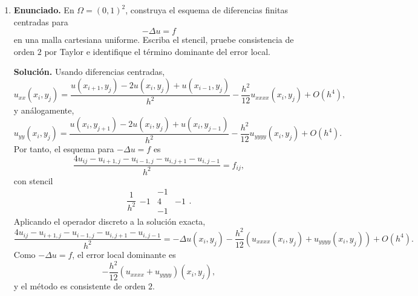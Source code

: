 \documentclass[11pt]{article}
\newcommand{\norm}[1]{\left\lVert #1\right\rVert}
\def\mat   #1{\mbox{\boldmath $\mathsf #1$}}
\def\vec   #1{\mbox{\boldmath $#1$}{}}
\begin{document}
\begin{enumerate}[label=\textbf{\arabic*.}, leftmargin=*]
    Sea $\vec u_h$ la solución discreta y sea $\vec u^I$ la restricción de la solución exacta a la malla. Si $\mat A_h$ denota la matriz del operador discreto, entonces
    \[
        \mat A_h\vec u_h=\vec f_h,
        \qquad
        \mat A_h\vec u^I=\vec f_h+\vec\tau_h,
    \]
    donde $\vec\tau_h$ es el error de truncamiento local. Para el error $\vec e_h=\vec u_h-\vec u^I$,
    \[
        \mat A_h\vec e_h=-\vec\tau_h.
    \]
    Si se dispone de estabilidad uniforme,
    \[
        \norm{\vec v_h}\le C\norm{\mat A_h\vec v_h}
        \qquad\text{con }C\text{ independiente de }h,
    \]
    entonces
    \[
        \norm{\vec e_h}
        \le
        C\norm{\vec\tau_h}
        =
        O(h^2).
    \]
    Así se obtiene convergencia global de orden $2$ en la norma considerada.

    En cambio, si sólo se tiene
    \[
        \norm{\vec v_h}\le C_h\norm{\mat A_h\vec v_h},
        \qquad C_h\to\infty,
    \]
    entonces
    \[
        \norm{\vec e_h}\le C_h\norm{\vec\tau_h}=O(C_hh^2).
    \]
    Esta cota implica convergencia únicamente si $C_hh^2\to0$. Además, aunque haya convergencia, el orden global puede ser menor que el orden local. Este es el punto central: consistencia local más estabilidad implica convergencia; consistencia sola no controla la propagación del error.

    \item \textbf{Enunciado.} En $\Omega=(0,1)^2$, construya el esquema de diferencias finitas centradas para
    \[
        -\Delta u=f
    \]
    en una malla cartesiana uniforme. Escriba el stencil, pruebe consistencia de orden $2$ por Taylor e identifique el término dominante del error local.

    \textbf{Solución.} Usando diferencias centradas,
    \[
        u_{xx}(x_i,y_j)
        =
        \frac{u(x_{i+1},y_j)-2u(x_i,y_j)+u(x_{i-1},y_j)}{h^2}
        -\frac{h^2}{12}u_{xxxx}(x_i,y_j)+O(h^4),
    \]
    y análogamente,
    \[
        u_{yy}(x_i,y_j)
        =
        \frac{u(x_i,y_{j+1})-2u(x_i,y_j)+u(x_i,y_{j-1})}{h^2}
        -\frac{h^2}{12}u_{yyyy}(x_i,y_j)+O(h^4).
    \]
    Por tanto, el esquema para $-\Delta u=f$ es
    \[
        \frac{4u_{ij}-u_{i+1,j}-u_{i-1,j}-u_{i,j+1}-u_{i,j-1}}{h^2}
        =
        f_{ij},
    \]
    con stencil
    \[
        \frac1{h^2}
        \begin{array}{ccc}
            & -1 & \\
            -1 & 4 & -1\\
            & -1 &
        \end{array}.
    \]
    Aplicando el operador discreto a la solución exacta,
    \[
        \frac{4u_{ij}-u_{i+1,j}-u_{i-1,j}-u_{i,j+1}-u_{i,j-1}}{h^2}
        =
        -\Delta u(x_i,y_j)
        -\frac{h^2}{12}\left(u_{xxxx}(x_i,y_j)+u_{yyyy}(x_i,y_j)\right)
        +O(h^4).
    \]
    Como $-\Delta u=f$, el error local dominante es
    \[
        -\frac{h^2}{12}\left(u_{xxxx}+u_{yyyy}\right)(x_i,y_j),
    \]
    y el método es consistente de orden $2$.

\end{enumerate}
\end{document}
